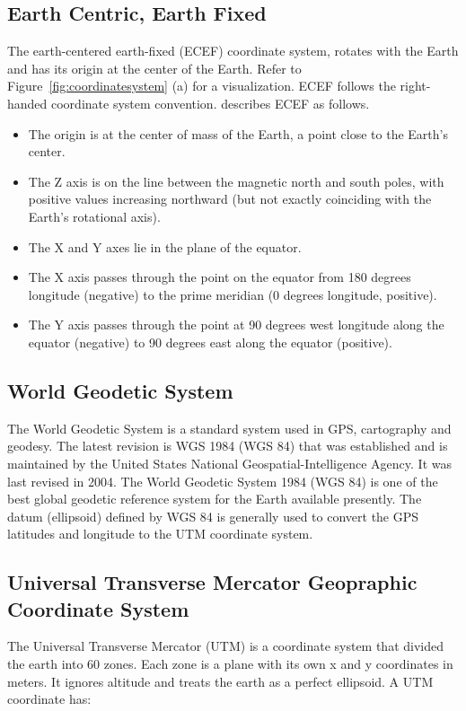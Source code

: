 \subsection{Earth Centric, Earth Fixed}

The earth-centered earth-fixed (ECEF) coordinate system, rotates with the Earth and has its origin at the center of the Earth. Refer to Figure~\ref{fig:coordinatesystem} (a) for a visualization. ECEF follows the right-handed coordinate system convention.  describes ECEF as follows.

\begin{itemize}
	\item The origin is at the center of mass of the Earth, a point close to the Earth's center.
	\item The Z axis is on the line between the magnetic north and south poles, with positive values increasing northward (but not exactly coinciding with the Earth's rotational axis).
	\item The X and Y axes lie in the plane of the equator.
	\item The X axis passes through the point on the equator from 180 degrees longitude (negative) to the prime meridian (0 degrees longitude, positive).
	\item The Y axis passes through the point at 90 degrees west longitude along the equator (negative) to 90 degrees east along the equator (positive).
\end{itemize}

\subsection{World Geodetic System}
The World Geodetic System is a standard system used in GPS, cartography and geodesy. The latest revision is WGS 1984 (WGS 84) that was established and is maintained by the United States National Geospatial-Intelligence Agency. It was last revised in 2004. The World Geodetic System 1984 (WGS 84) is one of the best global geodetic reference system for the Earth available presently. The datum (ellipsoid) defined by WGS 84 is generally used to convert the GPS latitudes and longitude to the UTM coordinate system.

\subsection{Universal Transverse Mercator Geopraphic Coordinate System}
The Universal Transverse Mercator (UTM) is a coordinate system that divided the earth into 60 zones. Each zone is a plane with its own x and y coordinates in meters. It ignores altitude and treats the earth as a perfect ellipsoid. A UTM coordinate has:

